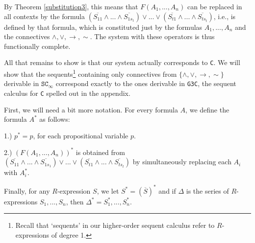 \documentclass{article}%
\theoremstyle{break}
\begin{document}
By Theorem \ref{substitution3}, this means that  $ F(A_1,...,A_n) $ can be replaced in all contexts by the formula $(\overline{S_{1 1}} \wedge... \wedge \overline{S_{1 s_{1}}}) \vee...\vee(\overline{S_{t 1}} \wedge...\wedge \overline{S_{t s_{t}}})$, i.e., is defined by that formula, which is constituted just by the formulas $A_1,...,A_n$ and the connectives $\wedge, \vee, \rightarrow, {\sim}$.
The system with these operators is thus functionally complete.

All that remains to show is that our system actually corresponds to \texttt{C}.
We will show that the sequents\footnote{Recall that `sequents' in our higher-order sequent calculus refer to $R$-expressions of degree 1.} containing only connectives from $\{\wedge, \vee, \rightarrow, {\sim}\} $ derivable in $\texttt{SC}_\infty$ correspond exactly to the ones derivable in \texttt{G3C}, the sequent calculus for \texttt{C} spelled out in the appendix.

First, we will need a bit more notation. For every formula $A$, we define the formula $A^*$ as follows:

1.) $p^*=p$, for each propositional variable $p$.

2.) $(F(A_1,...,A_n))^*$ is obtained from $(\overline{S_{1 1}} \wedge... \wedge \overline{S_{1 s_{1}}}) \vee...\vee(\overline{S_{t 1}} \wedge...\wedge \overline{S_{t s_{t}}})$ by simultaneously replacing each $A_i$ with $A_i^*$.

Finally, for any $R$-expression $S$, we let $S^*=(\overline{S})^*$ and if $\Delta$ is the series of $R$-expressions $S_1,..., S_n$, then $\Delta^*=S_1^*,..., S_n^*.$ 
\end{document}
